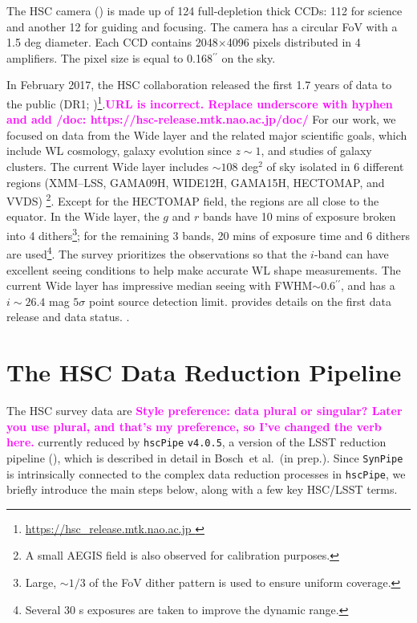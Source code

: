 \documentclass[useamsfonts]{pasj01}
\def\asec{$^{\prime\prime}$}
\def\etal{{\ et al.~}}
\def\hscpipe{\texttt{hscPipe}}
\def\synpipe{\texttt{SynPipe}}
\newcommand{\susan}[1]{\textcolor{magenta} {\textbf{#1}}}
\begin{document}
    The HSC camera (\citealt{Miyazaki2012}) is made up of 124 full-depletion thick CCDs: 112 for science and another 12 for guiding and focusing.
    The camera has a circular FoV with a 1.5 deg diameter.
    Each CCD contains 2048$\times$4096 pixels distributed in 4 amplifiers.
    The pixel size is equal to 0.168\asec{} on the sky.

   In February 2017, the HSC collaboration  released the first 1.7 years of data to the public (DR1;
    \citealt{HSCDR1})\footnote{\url{https://hsc_release.mtk.nao.ac.jp }}.\susan{URL is incorrect. Replace underscore with hyphen and add /doc: https://hsc-release.mtk.nao.ac.jp/doc/}
    For our work, we  focused on data from the Wide layer and the related major scientific goals, which include
    WL cosmology, galaxy evolution since $z{\sim}1$, and studies of galaxy clusters.
    The current Wide layer includes ${\sim}108$ deg$^2$ of sky isolated in
    6 different regions (XMM--LSS, GAMA09H, WIDE12H, GAMA15H, HECTOMAP, and VVDS)
    \footnote{A small AEGIS field is also observed for calibration purposes.}.
    Except for the HECTOMAP field, the regions are all close to the equator. 
        In the Wide layer, the $g$ and $r$ bands have 10 mins of exposure broken into 4
    dithers\footnote{Large, ${\sim}1/3$ of the FoV dither pattern is used to ensure
    uniform coverage.}; for the remaining 3 bands, 20 mins of exposure time and 6 dithers are
    used\footnote{Several 30 s exposures are taken to improve the dynamic range.}.
    The survey prioritizes the observations so that the $i$-band can have excellent
    seeing conditions to help make accurate WL shape measurements.
    The current Wide layer has impressive median seeing with FWHM${\sim}0.6$\asec{},
    and has a $i{\sim} 26.4$ mag $5\sigma$ point source detection limit. 
    \citealt{HSCDR1} provides details on the first data release and data status.
 .

\section{The HSC Data Reduction Pipeline}
    \label{ssec:hscpipe}

    The HSC survey data are \susan{Style preference: data plural or singular? Later you use plural, and that's my preference, so I've changed the verb here.} currently reduced by \hscpipe{} \texttt{v4.0.5}, a
    version of the LSST reduction pipeline (\citealt{Ivezic2008, Axelrod2010,
    Juric2015}), which is described in detail in Bosch\etal (in prep.).
    Since \synpipe{} is intrinsically connected to the complex data reduction
    processes in \hscpipe{},  we briefly introduce the main steps below, along with
    a few key HSC/LSST terms.
\end{document}
